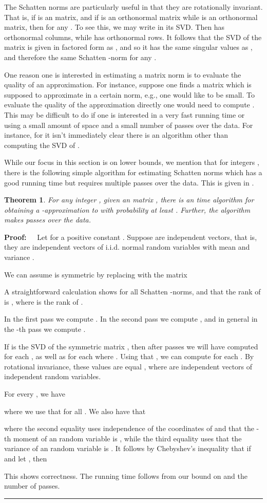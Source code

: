 \documentclass[11pt]{article}
\newtheorem{theorem}{Theorem}
\newenvironment{proof}{\begin{trivlist} \item {\bf Proof:~~}}
  {\qed\end{trivlist}}
\def\qed{\hfill\rule{2mm}{2mm}}
\begin{document}
The Schatten norms are particularly useful
in that they are rotationally invariant. That is, if  is an  matrix, and if  is
an  orthonormal matrix while  is an  orthonormal matrix, then 
 for any . To see this, we may write  in its
SVD. Then  has orthonormal columns, while  has orthonormal rows. It follows that
the SVD of the matrix  is given in factored form as , and so it has
the same singular values as , and therefore the same Schatten -norm for any . 

One reason one is interested in estimating a matrix norm is to evaluate the quality of an approximation.
For instance, suppose one finds a matrix  which is supposed to approximate  in a certain
norm, e.g., one would like  to be small. To evaluate the quality of the approximation
directly one would need to compute . This may be difficult to do if one is interested
in a very fast running time or using a small amount of space and a small number of passes over the data. 
For instance, for 
it isn't immediately clear there is an algorithm other than computing the SVD of . 

While our focus in this section is on lower bounds, we mention that for integers , there
is the following simple algorithm for estimating Schatten norms which has a good running time but requires multiple passes over
the data. This is given in \cite{lnw14}. 
\begin{theorem}
For any integer , given an  matrix , 
there is an  time algorithm for obtaining a -approximation to
 with probability at least . Further,
the algorithm makes  passes over the data. 
\end{theorem}
\begin{proof}
Let  for a positive constant . 
Suppose  are independent  vectors, that is, they are independent
vectors of i.i.d. normal random variables with mean  and variance . 

We can assume  is symmetric by replacing  with the matrix

A straightforward calculation shows  for all Schatten -norms, and
that the rank of  is , where  is the rank of .

In the first pass we compute . In the second pass we compute , and
in general in the -th pass we compute . 

If  is the SVD
of the symmetric matrix , 
then after  passes we will have computed  for each ,
as well as  for each  where . Using that ,
we can compute  for each . By rotational invariance, these 
values are equal , where  are 
independent vectors of independent  random variables. 

For every , we have

where we use that  for all . We also have that

where the second equality uses independence of the coordinates of  and that the -th moment of an  random variable is , while the third equality uses that the variance
of an  random variable is . It follows by Chebyshev's inequality that if
 and let , then

This shows correctness. The running time follows from our bound on  and the number  of passes. 
\end{proof}
\end{document}
